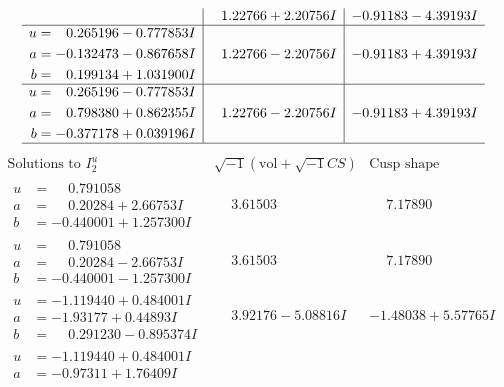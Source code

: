 \documentclass[1p]{elsarticle_modified}
\theoremstyle{definition}
\newcommand{\I}{\sqrt{-1}}
\begin{document}
$$\begin{array}{c|c|c}
 & \phantom{-}1.22766 + 2.20756 I & -0.91183 - 4.39193 I \\ \hline\begin{aligned}
u &= \phantom{-}0.265196 - 0.777853 I \\
a &= -0.132473 - 0.867658 I \\
b &= \phantom{-}0.199134 + 1.031900 I\end{aligned}
 & \phantom{-}1.22766 - 2.20756 I & -0.91183 + 4.39193 I \\ \hline\begin{aligned}
u &= \phantom{-}0.265196 - 0.777853 I \\
a &= \phantom{-}0.798380 + 0.862355 I \\
b &= -0.377178 + 0.039196 I\end{aligned}
 & \phantom{-}1.22766 - 2.20756 I & -0.91183 + 4.39193 I\\
 \hline 
 \end{array}$$\newpage$$\begin{array}{c|c|c}  
\text{Solutions to }I^u_{2}& \I (\text{vol} + \sqrt{-1}CS) & \text{Cusp shape}\\
 \hline 
\begin{aligned}
u &= \phantom{-}0.791058\phantom{ +0.000000I} \\
a &= \phantom{-}0.20284 + 2.66753 I \\
b &= -0.440001 + 1.257300 I\end{aligned}
 & \phantom{-}3.61503\phantom{ +0.000000I} & \phantom{-}7.17890\phantom{ +0.000000I} \\ \hline\begin{aligned}
u &= \phantom{-}0.791058\phantom{ +0.000000I} \\
a &= \phantom{-}0.20284 - 2.66753 I \\
b &= -0.440001 - 1.257300 I\end{aligned}
 & \phantom{-}3.61503\phantom{ +0.000000I} & \phantom{-}7.17890\phantom{ +0.000000I} \\ \hline\begin{aligned}
u &= -1.119440 + 0.484001 I \\
a &= -1.93177 + 0.44893 I \\
b &= \phantom{-}0.291230 - 0.895374 I\end{aligned}
 & \phantom{-}3.92176 - 5.08816 I & -1.48038 + 5.57765 I \\ \hline\begin{aligned}
u &= -1.119440 + 0.484001 I \\
a &= -0.97311 + 1.76409 I \\

\end{aligned}
\end{array}$$
\end{document}
